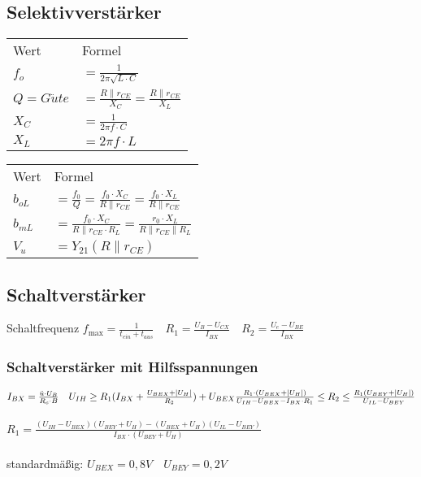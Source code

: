     \subsection{Selektivverstärker} %
    \begin{minipage}{0.45\columnwidth}
        \renewcommand{\arraystretch}{1.05}
        \begin{table}[H]
            \begin{tabularx}{\columnwidth}{l l}
                Wert & Formel \\
                $f_o$ & $=\frac{1}{2\pi\sqrt{L\cdot C}}$ \\
                $Q=G\ddot{u}te$ & $=\frac{R\parallel r_{CE}}{X_C}=\frac{R\parallel r_{CE}}{X_L}$ \\
                $X_C$ & $=\frac{1}{2\pi f\cdot C}$ \\
                $X_L$ & $=2\pi f\cdot L$ \\
            \end{tabularx}
        \end{table}
    \end{minipage}
    \begin{minipage}{0.45\columnwidth}
        \renewcommand{\arraystretch}{1.05}
        \begin{table}[H]
            \begin{tabularx}{\columnwidth}{l l}
                Wert & Formel \\
                $b_{oL}$ & $=\frac{f_0}{Q}=\frac{f_0\cdot X_C}{R\parallel r_{CE}}=\frac{f_0\cdot X_L}{R\parallel r_{CE}}$ \\
                $b_{mL}$ & $=\frac{f_0\cdot X_C}{R\parallel r_{CE}\cdot R_L}=\frac{r_0\cdot X_L}{R\parallel r_{CE}\parallel R_L}$ \\
                $V_u$ & $=Y_{21}(R\parallel r_{CE})$ \\
            \end{tabularx}
        \end{table}
    \end{minipage}
    \subsection{Schaltverstärker}
    Schaltfrequenz $f_{\max}=\frac{1}{t_{ein}+t_{aus}}\quad R_1=\frac{U_B-U_{CX}}{I_{BX}}\quad R_2=\frac{U_e-U_{BE}}{I_{BX}}$
    \subsubsection{Schaltverstärker mit Hilfsspannungen}
    \large
    $I_{BX}=\frac{\ddot{u}\cdot U_B}{R_c\cdot B}\quad U_{IH}\geq R_1(I_{BX}+\frac{U_{BEX}+|U_H|}{R_2})+U_{BEX}\\\\
    \frac{R_1\cdot (U_{BEX}+|U_H|)}{U_{IH}-U_{BEX}-I_{BX}\cdot R_1}\leq R_2\leq\frac{R_1(U_{BEY}+|U_H|)}{U_{IL}-U_{BEY}}$\\\\
    $R_1=\frac{(U_{IH}-U_{BEX})(U_{BEY}+U_H)-(U_{BEX}+U_H)(U_{IL}-U_{BEY})}{I_{BX}\cdot (U_{BEY}+U_H)}$\\\\
    \normalsize
    standardmäßig: $U_{BEX}=0,8V\quad U_{BEY}=0,2V$
